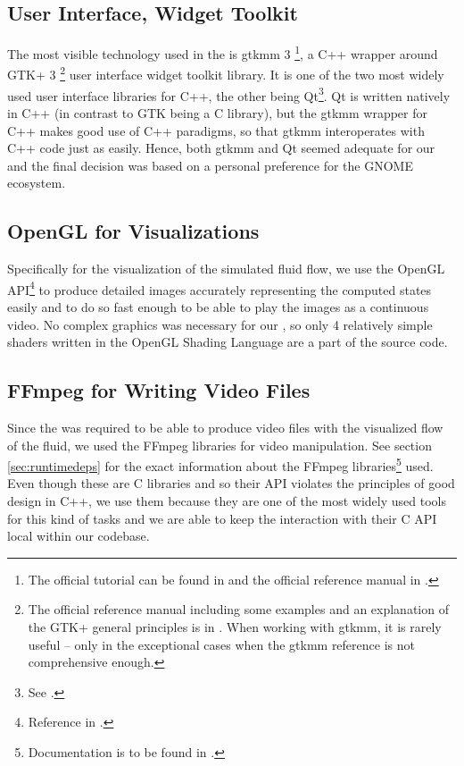 \documentclass[11pt,a4paper,twoside,openright]{report}
\begin{document}
\subsection{User Interface, Widget Toolkit}
The most visible technology used in the \software{} is gtkmm 3 \footnote{The official tutorial can be found in \cite{gtkmm3} and the official reference manual in \cite{gtkmm3ref}.}, a C++ wrapper around GTK+ 3 \footnote{The official reference manual including some examples and an explanation of the GTK+ general principles is in \cite{gtk3ref}. When working with gtkmm, it is rarely useful -- only in the exceptional cases when the gtkmm reference is not comprehensive enough.} user interface widget toolkit library. It is one of the two most widely used user interface libraries for C++, the other being Qt\footnote{See \cite{qt}.}. Qt is written natively in C++ (in contrast to GTK being a C library), but the gtkmm wrapper for C++ makes good use of C++ paradigms, so that gtkmm interoperates with C++ code just as easily. Hence, both gtkmm and Qt seemed adequate for our \software{} and the final decision was based on a personal preference for the GNOME ecosystem.

\subsection{OpenGL for Visualizations}
Specifically for the visualization of the simulated fluid flow, we use the OpenGL API\footnote{Reference in \cite{openglref}.} to produce detailed images accurately representing the computed states easily and to do so fast enough to be able to play the images as a continuous video. No complex graphics was necessary for our \software{}, so only 4 relatively simple shaders written in the OpenGL Shading Language are a part of the source code.

\subsection{FFmpeg for Writing Video Files}
Since the \software{} was required to be able to produce video files with the visualized flow of the fluid, we used the FFmpeg libraries for video manipulation. See section \ref{sec:runtimedeps} for the exact information about the FFmpeg libraries\footnote{Documentation is to be found in \cite{ffmpegdoc}.} used. Even though these are C libraries and so their API violates the principles of good design in C++, we use them because they are one of the most widely used tools for this kind of tasks and we are able to keep the interaction with their C API local within our codebase.
\end{document}
